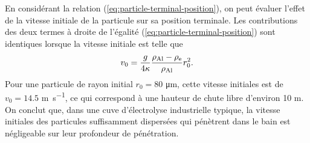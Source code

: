 

\begin{remarque}
  En considérant la relation (\ref{eq:particle-terminal-position}), on
  peut évaluer l'effet de la vitesse initiale de la particule sur sa
  position terminale. Les contributions des deux termes à droite de
  l'égalité (\ref{eq:particle-terminal-position}) sont identiques
  lorsque la vitesse initiale est telle que
  \begin{equation}
    v_0 = \frac{g}{4\kappa}\frac{\rho_\mathrm{Al} -
      \rho_\mathrm{e}}{\rho_\mathrm{Al}} r_0^2.
  \end{equation}
  Pour une particule de rayon initial $r_0 = \num{80}$
  \si{\micro\meter}, cette vitesse initiales est de $v_0 = \num{14.5}$
  \si{\meter\per\second}, ce qui correspond à une hauteur de chute
  libre d'environ \num{10} \si{\meter}. On conclut que, dans une cuve
  d'électrolyse industrielle typique, la vitesse initiales des
  particules suffisamment dispersées qui pénètrent dans le bain est
  négligeable sur leur profondeur de pénétration.
\end{remarque}
